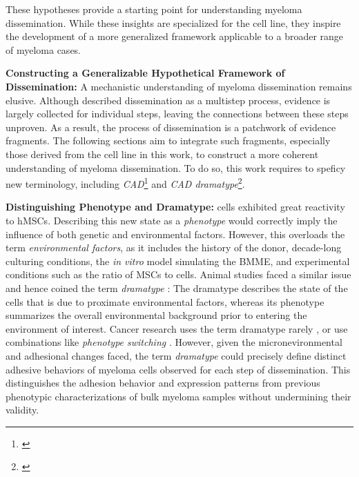 These hypotheses  provide a
starting point for understanding myeloma dissemination. While these insights are
specialized for the \INA cell line, they inspire the development of a more
generalized framework applicable to a broader range of myeloma cases.



\textbf{Constructing a Generalizable Hypothetical Framework of Dissemination:}
A mechanistic understanding of myeloma dissemination remains elusive. Although
\citet{zeissigTumourDisseminationMultiple2020} described dissemination as a
multistep process, evidence is largely collected for individual steps, leaving
the connections between these steps unproven. As a result, the process of
dissemination is a patchwork of evidence fragments. The following sections aim
to integrate such fragments, especially those derived from the \INA cell line in
this work, to construct a more coherent understanding of myeloma dissemination.
To do so, this work requires to speficy new terminology, including
\emph{\acf{CAD}}\footnote{\footcad\label{foot:cad}}
and \emph{\ac{CAD} dramatype}\footnote{\footcaddt\label{foot:caddt}}.



\textbf{Distinguishing Phenotype and Dramatype:}
\INA cells exhibited great reactivity to \acp{hMSC}. Describing this new state
as a \emph{phenotype} would correctly imply the influence of both genetic and
environmental factors. However, this overloads the term \emph{environmental
    factors}, as it includes the history of the donor, decade-long culturing
conditions, the \textit{in vitro} model simulating the \ac{BMME}, and
experimental conditions such as the ratio of \acp{MSC} to \INA cells. Animal
studies faced a similar issue and hence coined the term
\emph{dramatype}
\cite{zutphenPrinciplesLaboratoryAnimal2001}: The dramatype describes the state
of the cells that is due to proximate environmental factors, whereas its
phenotype summarizes the overall environmental background prior to entering the
environment of interest. Cancer research uses the term dramatype rarely
\cite{hinoStudiesFamilialTumors2004}, or use combinations like \emph{phenotype
    switching} \cite{woutersRobustGeneExpression2020}. However, given the
micronevironmental and adhesional changes faced, the term \emph{dramatype} could
precisely define distinct adhesive behaviors of myeloma cells observed for each
step of dissemination. This distinguishes the adhesion behavior and expression
patterns from previous phenotypic characterizations of bulk myeloma samples
without undermining their validity.





